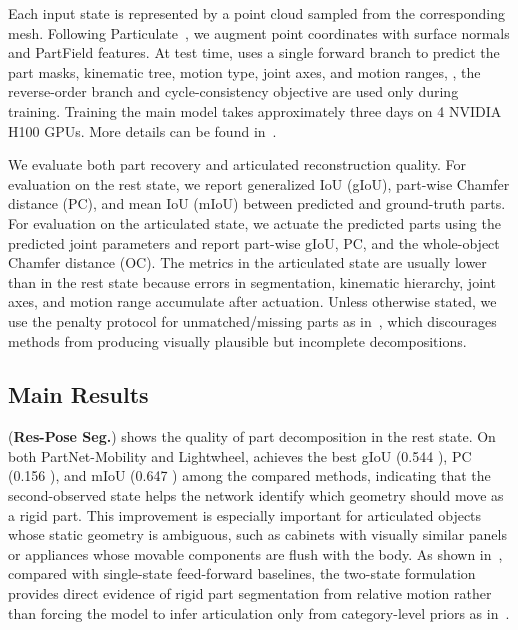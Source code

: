 Each input state is represented by a point cloud sampled from the corresponding mesh.
Following Particulate~\cite{li2025particulate}, we augment point coordinates with surface normals and PartField features.
At test time, \method uses a single forward branch to predict the part masks, kinematic tree, motion type, joint axes, and motion ranges, \ie, the reverse-order branch and cycle-consistency objective are used only during training. Training the main model takes approximately three days on 4 NVIDIA H100 GPUs. More details can be found in~.

We evaluate both part recovery and articulated reconstruction quality.
For evaluation on the rest state, we report generalized IoU (gIoU), part-wise Chamfer distance (PC), and mean IoU (mIoU) between predicted and ground-truth parts.
For evaluation on the articulated state, we actuate the predicted parts using the predicted joint parameters and report part-wise gIoU, PC, and the whole-object Chamfer distance (OC).
The metrics in the articulated state are usually lower than in the rest state because errors in segmentation, kinematic hierarchy, joint axes, and motion range accumulate after actuation.
Unless otherwise stated, we use the penalty protocol for unmatched/missing parts as in~\cite {li2025particulate}, which discourages methods from producing visually plausible but incomplete decompositions.

\subsection{Main Results}
\label{sec:exp_results}

 (\textbf{Res-Pose Seg.}) shows the quality of part decomposition in the rest state.
On both PartNet-Mobility and Lightwheel, \method achieves the best gIoU (0.544 ), PC (0.156 ), and mIoU (0.647 ) among the compared methods,
indicating that the second-observed state helps the network identify which geometry should move as a rigid part.
This improvement is especially important for articulated objects whose static geometry is ambiguous, such as cabinets with visually similar panels or appliances whose movable components are flush with the body.
As shown in~, compared with single-state feed-forward baselines, the two-state formulation provides direct evidence of rigid part segmentation from relative motion rather than forcing the model to infer articulation only from category-level priors as in~\cite{li2025particulate}.

